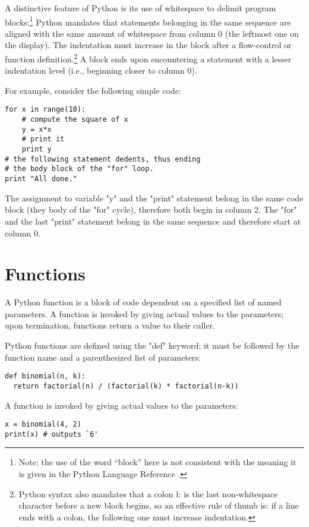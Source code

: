{A distinctive feature of Python is its use of whitespace to delimit
program blocks:\footnote{Note: the use of the word ``block'' here is
  not consistent with the meaning it is given in the Python Language
  Reference \cite{python:reference}.}  
Python mandates that statements belonging in the same sequence are
aligned with the same amount of whitespace from column 0 (the leftmost
one on the display).  The indentation must increase in the block after
a flow-control or function definition.\footnote{Python syntax also
  mandates that a colon \l{:} is the last non-whitespace character
  before a new block begins, so an effective rule of thumb is: if a
  line ends with a colon, the following one must increase
  indentation.}  A block ends upon encountering a statement with a
lesser indentation level (i.e., beginning closer to column 0).

For example, consider the following simple code:
\begin{lstlisting}
for x in range(10):
    # compute the square of x
    y = x*x
    # print it
    print y
# the following statement dedents, thus ending
# the body block of the "for" loop.
print "All done."
\end{lstlisting}
The assignment to variable "y" and the "print"
statement belong in the same code block (they body of the
"for" cycle), therefore both begin in column 2.  The
"for" and the last "print" statement belong in
the same sequence and therefore start at column 0. 


\section{Functions}
\label{sec:functions}

A Python function is a block of code dependent on a specified list of
named parameters.  A function is invoked by giving actual values to
the parameters; upon termination, functions return a value to their
caller. 

Python functions are defined using the "def" keyword; it must be
followed by the function name and a parenthesized list of parameters:
\begin{lstlisting}
def binomial(n, k):
  return factorial(n) / (factorial(k) * factorial(n-k))
\end{lstlisting}
A function is invoked by giving actual values to the parameters:
\begin{lstlisting}
x = binomial(4, 2)
print(x) # outputs `6'
\end{lstlisting}

}
